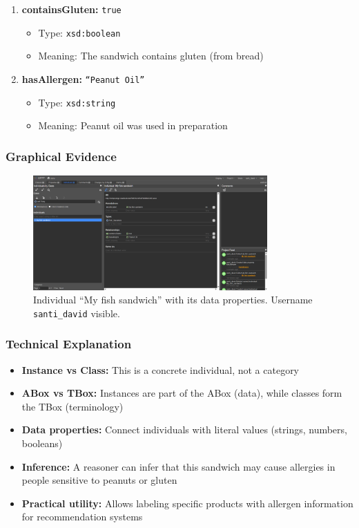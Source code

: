 \documentclass[12pt,a4paper]{article}
\begin{document}
\begin{enumerate}
    \item \textbf{containsGluten:} \texttt{true}
    \begin{itemize}
        \item Type: \texttt{xsd:boolean}
        \item Meaning: The sandwich contains gluten (from bread)
    \end{itemize}
    
    \item \textbf{hasAllergen:} \texttt{``Peanut Oil''}
    \begin{itemize}
        \item Type: \texttt{xsd:string}
        \item Meaning: Peanut oil was used in preparation
    \end{itemize}
\end{enumerate}

\subsubsection{Graphical Evidence}

\begin{figure}[H]
    \centering
    \includegraphics[width=0.8\textwidth]{screenshots/My fish sandwich.png}
    \caption{Individual ``My fish sandwich'' with its data properties. Username \texttt{santi\_david} visible.}
    \label{fig:my_fish_sandwich}
\end{figure}

\subsubsection{Technical Explanation}

\begin{itemize}
    \item \textbf{Instance vs Class:} This is a concrete individual, not a category
    \item \textbf{ABox vs TBox:} Instances are part of the ABox (data), while classes form the TBox (terminology)
    \item \textbf{Data properties:} Connect individuals with literal values (strings, numbers, booleans)
    \item \textbf{Inference:} A reasoner can infer that this sandwich may cause allergies in people sensitive to peanuts or gluten
    \item \textbf{Practical utility:} Allows labeling specific products with allergen information for recommendation systems
\end{itemize}
\end{document}
